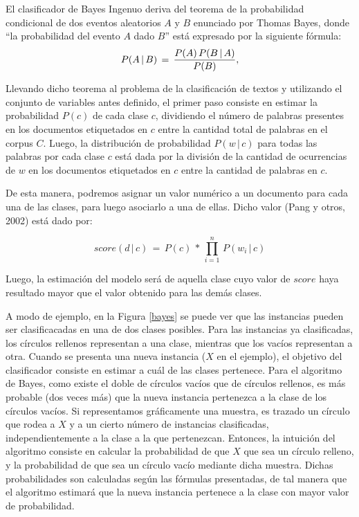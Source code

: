 {El clasificador de Bayes Ingenuo deriva del teorema de la probabilidad condicional de dos eventos aleatorios $A$ y $B$ enunciado por Thomas Bayes, donde ``la probabilidad del evento $A$ dado $B$'' est\'a expresado por la siguiente f\'ormula:
\newline \newline
$$P(A \, | \, B) \, = \, {P(A) \, P(B \, | \, A) \over P(B)},$$

Llevando dicho teorema al problema de la clasificaci\'on de textos y utilizando el conjunto de variables antes definido, el primer paso consiste en estimar la probabilidad $P(c)$ de cada clase $c$, dividiendo el n\'umero de palabras presentes en los documentos etiquetados en $c$ entre la cantidad total de palabras en el corpus $C$. Luego, la distribuci\'on de probabilidad $P(w \, | \, c)$ para todas las palabras por cada clase $c$ est\'a dada por la divisi\'on de la cantidad de ocurrencias de $w$ en los documentos etiquetados en $c$ entre la cantidad de palabras en $c$.
\newline

De esta manera, podremos asignar un valor num\'erico a un documento para cada una de las clases, para luego asociarlo a una de ellas. Dicho valor (Pang y otros, 2002) est\'a dado por:
\newline

$$ score(d \, | \, c) \, = \, P(c) \, * \, \prod_{i=1}^n \, P(w_{i} \, | \, c) $$

Luego, la estimaci\'on del modelo ser\'a de aquella clase cuyo valor de $score$ haya resultado mayor que el valor obtenido para las dem\'as clases.
\newline

A modo de ejemplo, en la Figura \ref{bayes} se puede ver que las instancias pueden ser clasificacadas en una de dos clases posibles. Para las instancias ya clasificadas, los c\'irculos rellenos representan a una clase, mientras que los vac\'ios representan a otra. Cuando se presenta una nueva instancia ($X$ en el ejemplo), el objetivo del clasificador consiste en estimar a cu\'al de las clases pertenece. Para el algoritmo de Bayes, como existe el doble de c\'irculos vac\'ios que de c\'irculos rellenos, es m\'as probable (dos veces m\'as) que la nueva instancia pertenezca a la clase de los c\'irculos vac\'ios. Si representamos gr\'aficamente una muestra, es trazado un c\'irculo que rodea a $X$ y a un cierto n\'umero de instancias clasificadas, independientemente a la clase a la que pertenezcan. Entonces, la intuici\'on del algoritmo consiste en calcular la probabilidad de que $X$ que sea un c\'irculo relleno, y la probabilidad de que sea un c\'irculo vac\'io mediante dicha muestra. Dichas probabilidades son calculadas seg\'un las f\'ormulas presentadas, de tal manera que el algoritmo estimar\'a que la nueva instancia pertenece a la clase con mayor valor de probabilidad.
\newline

}
